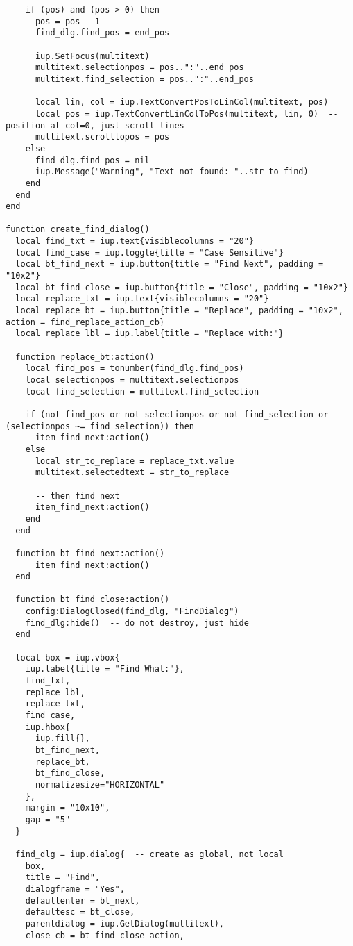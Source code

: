 \documentclass{ctexart}
\begin{document}
\begin{lstlisting}
    if (pos) and (pos > 0) then
      pos = pos - 1
      find_dlg.find_pos = end_pos

      iup.SetFocus(multitext)
      multitext.selectionpos = pos..":"..end_pos
      multitext.find_selection = pos..":"..end_pos

      local lin, col = iup.TextConvertPosToLinCol(multitext, pos)
      local pos = iup.TextConvertLinColToPos(multitext, lin, 0)  -- position at col=0, just scroll lines 
      multitext.scrolltopos = pos
    else
      find_dlg.find_pos = nil
      iup.Message("Warning", "Text not found: "..str_to_find)
    end
  end
end

function create_find_dialog()
  local find_txt = iup.text{visiblecolumns = "20"}
  local find_case = iup.toggle{title = "Case Sensitive"}
  local bt_find_next = iup.button{title = "Find Next", padding = "10x2"}
  local bt_find_close = iup.button{title = "Close", padding = "10x2"}
  local replace_txt = iup.text{visiblecolumns = "20"}
  local replace_bt = iup.button{title = "Replace", padding = "10x2", action = find_replace_action_cb}
  local replace_lbl = iup.label{title = "Replace with:"}

  function replace_bt:action()
    local find_pos = tonumber(find_dlg.find_pos)
    local selectionpos = multitext.selectionpos
    local find_selection = multitext.find_selection

    if (not find_pos or not selectionpos or not find_selection or (selectionpos ~= find_selection)) then
      item_find_next:action()
    else
      local str_to_replace = replace_txt.value
      multitext.selectedtext = str_to_replace

      -- then find next
      item_find_next:action()
    end
  end

  function bt_find_next:action()
      item_find_next:action()
  end

  function bt_find_close:action()
    config:DialogClosed(find_dlg, "FindDialog")
    find_dlg:hide()  -- do not destroy, just hide
  end

  local box = iup.vbox{
    iup.label{title = "Find What:"},
    find_txt,
    replace_lbl,
    replace_txt,
    find_case,
    iup.hbox{
      iup.fill{},
      bt_find_next,
      replace_bt,
      bt_find_close,
      normalizesize="HORIZONTAL"
    },
    margin = "10x10", 
    gap = "5"
  }

  find_dlg = iup.dialog{  -- create as global, not local
    box, 
    title = "Find", 
    dialogframe = "Yes", 
    defaultenter = bt_next, 
    defaultesc = bt_close,
    parentdialog = iup.GetDialog(multitext),
    close_cb = bt_find_close_action,


\end{lstlisting}
\end{document}
